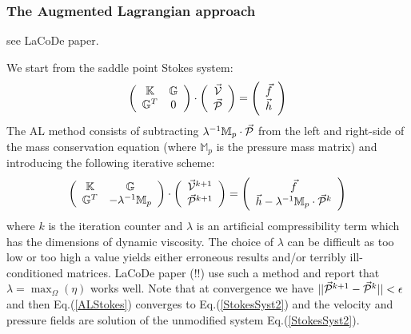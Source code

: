 \subsubsection{The Augmented Lagrangian approach}


see LaCoDe paper.

We start from the saddle point Stokes system:
\begin{equation}
\left(
\begin{array}{cc}
{\mathbb{K}} & {\mathbb{G}} \\ {\mathbb{G}}^T & 0 
\end{array}
\right)
\cdot
\left(
\begin{array}{c}
\vec{\cal V} \\ \vec{\cal P}
\end{array}
\right)
=
\left(
\begin{array}{c}
\vec{f} \\ \vec{h}
\end{array}
\right)
\label{StokesSyst2}
\end{equation}
The AL method consists of subtracting $\lambda^{-1} \mathbb{M}_p \cdot \vec{\cal P}$ from the left and 
right-side of the mass conservation equation (where $\mathbb{M}_p$ is the pressure mass matrix) 
and introducing the following iterative scheme:
\begin{equation}
\left(
\begin{array}{cc}
{\mathbb{K}} & {\mathbb{G}} \\ {\mathbb{G}}^T & -\lambda^{-1} \mathbb{M}_p
\end{array}
\right)
\cdot
\left(
\begin{array}{c}
\vec{\cal V}^{k+1} \\ \vec{\cal P}^{k+1}
\end{array}
\right)
=
\left(
\begin{array}{c}
\vec{f} \\ \vec{h} - \lambda^{-1} \mathbb{M}_p \cdot \vec{\cal P}^k
\end{array}
\right)
\label{ALStokes}
\end{equation}
where $k$ is the iteration counter and $\lambda$ is an artificial compressibility term which has 
the dimensions of dynamic viscosity. 
The choice of $\lambda$ can be difficult as too low or too high a value yields either erroneous results and/or terribly ill-conditioned matrices. LaCoDe paper (!!) use such a method and report that $\lambda=\max_\Omega({\eta})$
works well. 
Note that at convergence we have $||\vec{\cal P}^{k+1}-\vec{\cal P}^k||<\epsilon$ and then Eq.(\ref{ALStokes}) converges to Eq.(\ref{StokesSyst2}) and the velocity and pressure fields are solution of the unmodified system Eq.(\ref{StokesSyst2}).

